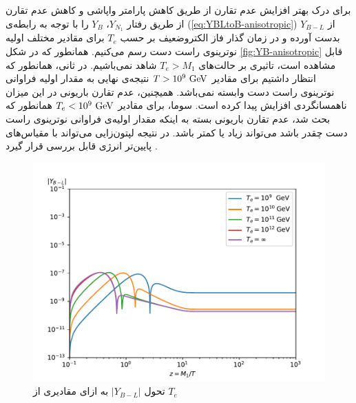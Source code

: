 \documentclass[a4paper]{book}
\begin{document}
برای درک بهتر افزایش عدم تقارن از طریق کاهش پارامتر واپاشی و کاهش عدم تقارن از طریق رفتار {\footnotesize$Y_{N_1}$}، {\footnotesize$Y_B$} را با توجه به رابطه‌ی (\ref{eq:YBLtoB-anisotropic}) از {\footnotesize$Y_{B-L}$} بدست آورده و در زمان گذار فاز الکتروضعیف بر حسب {\footnotesize$T_e$} برای مقادیر مختلف اولیه نوترینوی راست دست رسم می‌کنیم.
همانطور که در شکل \ref{fig:YB-anisotropic} قابل مشاهده است، تاثیری بر حالت‌های {\footnotesize$T_e>M_1$} شاهد نمی‌باشیم. در ثانی، همانطور که انتظار داشتیم برای مقادیر {\footnotesize$T>10^9\ {\rm GeV}$} نتیجه‌ی نهایی به مقدار اولیه فراوانی نوترینوی راست دست وابسته نمی‌باشد. همیچنین، عدم تقارن باریونی در این میزان ناهمسانگردی افزایش پیدا کرده است. سوما، برای مقادیر {\footnotesize$T_e<10^9\ {\rm GeV}$} همانطور که بحث شد، عدم تقارن باریونی بسته به اینکه مقدار اولیه‌ی فراوانی نوترینوی راست دست چقدر باشد می‌تواند زیاد یا کمتر باشد. در نتیجه لپتون‌زایی می‌تواند با مقیاس‌های پایین‌تر انرژی قابل بررسی قرار گیرد \cite{Chun:2017spz}.
\begin{figure}[b]
	\centering
	\includegraphics[width=13cm]{fig-BL-anisotropic.pdf}
	\caption{تحول {\footnotesize$|Y_{B-L}|$} به ازای مقادیری از {\footnotesize$T_e$} \label{fig:YBL-anisotropic}}
\end{figure}
\end{document}
